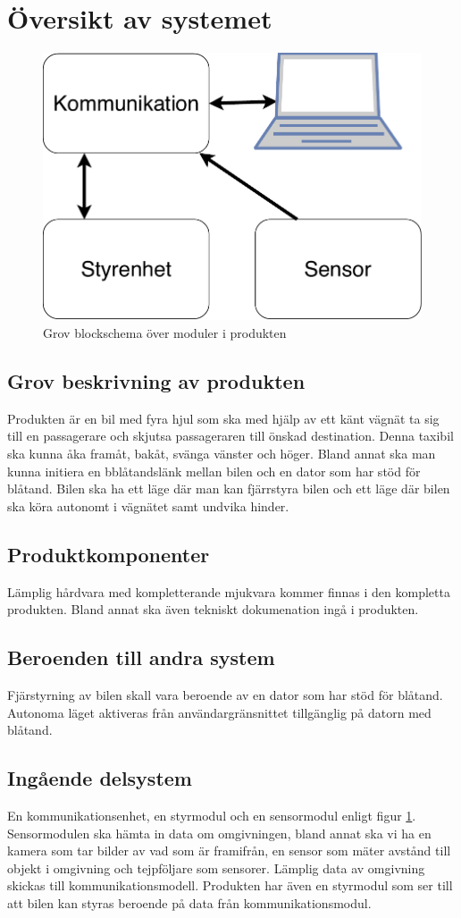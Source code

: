 \documentclass[kravspec/krav.tex]{subfiles}
\begin{document}
\section{Översikt av systemet}

\begin{figure}[h]
    \centering
    \includegraphics[width=0.6\linewidth]{kravspec/figures/overview-schema.pdf}
    \caption{Grov blockschema över moduler i produkten}
    \label{fig:overview}
\end{figure}

\subsection{Grov beskrivning av produkten}
Produkten är en bil med fyra hjul som ska med hjälp av ett känt vägnät ta sig
till en passagerare och skjutsa passageraren till önskad destination. Denna
taxibil ska kunna åka framåt, bakåt, svänga vänster och höger.  Bland annat ska
man kunna initiera en bblåtandslänk mellan bilen och en dator som har stöd för
blåtand. Bilen ska ha ett läge där man kan fjärrstyra bilen och ett läge där
bilen ska köra autonomt i vägnätet samt undvika hinder.

\subsection{Produktkomponenter}
Lämplig hårdvara med kompletterande mjukvara kommer finnas i den kompletta
produkten.  Bland annat ska även tekniskt dokumenation ingå i produkten.

\subsection{Beroenden till andra system}
Fjärstyrning av bilen skall vara beroende av en dator som har stöd för blåtand.
Autonoma läget aktiveras från användargränsnittet tillgänglig på datorn med
blåtand.

\subsection{Ingående delsystem}
En kommunikationsenhet, en styrmodul och en sensormodul enligt figur
\ref{fig:overview}. Sensormodulen ska hämta in data om omgivningen, bland annat
ska vi ha en kamera som tar bilder av vad som är framifrån, en sensor som mäter
avstånd till objekt i omgivning och tejpföljare som sensorer. Lämplig data av
omgivning skickas till kommunikationsmodell. Produkten har även en styrmodul
som ser till att bilen kan styras beroende på data från kommunikationsmodul.
\end{document}
